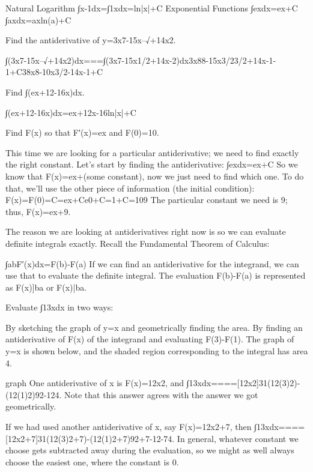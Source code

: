Natural Logarithm
∫x-1dx=∫1xdx=ln|x|+C
Exponential Functions
∫exdx=ex+C
∫axdx=axln(a)+C
\begin{example}
Find the antiderivative of y=3x7-15x--√+14x2.

\begin{solution}
∫(3x7-15x--√+14x2)dx===∫(3x7-15x1/2+14x-2)dx3x88-15x3/23/2+14x-1-1+C38x8-10x3/2-14x-1+C
\end{solution}\end{example}

\begin{example}
Find ∫(ex+12-16x)dx.

\begin{solution}
  ∫(ex+12-16x)dx=ex+12x-16ln|x|+C
\end{solution}\end{example}

\begin{example}
Find F(x) so that F′(x)=ex and F(0)=10.

\begin{solution}
This time we are looking for a particular antiderivative; we need to find exactly the right constant. Let's start by finding the antiderivative:
∫exdx=ex+C
So we know that F(x)=ex+(some constant), now we just need to find which one. To do that, we'll use the other piece of information (the initial condition):
F(x)=F(0)=C=ex+Ce0+C=1+C=109
The particular constant we need is 9; thus, F(x)=ex+9.
\end{solution}\end{example}

The reason we are looking at antiderivatives right now is so we can evaluate definite integrals exactly. Recall the Fundamental Theorem of Calculus:

∫abF′(x)dx=F(b)-F(a)
If we can find an antiderivative for the integrand, we can use that to evaluate the definite integral. The evaluation F(b)-F(a) is represented as F(x)]ba or F(x)|ba.

\begin{example}
Evaluate ∫13xdx in two ways:

\begin{solution}
By sketching the graph of y=x and geometrically finding the area.
By finding an antiderivative of F(x) of the integrand and evaluating F(3)-F(1).
The graph of y=x is shown below, and the shaded region corresponding to the integral has area 4.

graph
One antiderivative of x is F(x)=12x2, and
∫13xdx====[12x2]31(12(3)2)-(12(1)2)92-124.
Note that this answer agrees with the answer we got geometrically.

If we had used another antiderivative of x, say F(x)=12x2+7, then
∫13xdx====[12x2+7]31(12(3)2+7)-(12(1)2+7)92+7-12-74.
In general, whatever constant we choose gets subtracted away during the evaluation, so we might as well always choose the easiest one, where the constant is 0.
\end{solution}\end{example}

